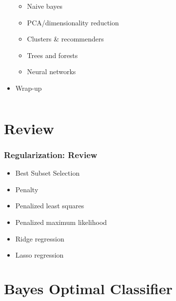 \documentclass[mathserif, xcolor=table, svgnames]{beamer}
\begin{document}
\begin{frame}
\begin{columns}
\begin{column}{0.5\linewidth}
\begin{itemize}
      \begin{itemize}
      \item \alert{Naive bayes}
      \item PCA/dimensionality reduction
      \item Clusters \& recommenders
      \item Trees and forests
      \item Neural networks
      \end{itemize}
    \item Wrap-up
    \end{itemize}
  \end{column}
\end{columns}
\end{frame}

\section{Review}

\begin{frame}
  \frametitle{Regularization: Review}
  \begin{itemize}
  \item Best Subset Selection
  \item Penalty
  \item Penalized least squares
  \item Penalized maximum likelihood
  \item Ridge regression
  \item Lasso regression
  \end{itemize}
\end{frame}

\section{Bayes Optimal Classifier}
\frame{\tableofcontents[currentsection]}
\end{document}
